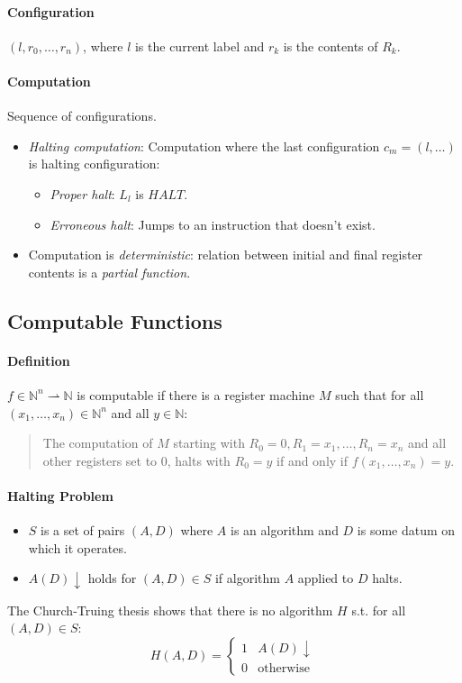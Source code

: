 \documentclass[twocolumn,english]{article}
\begin{document}
\paragraph{Configuration}

$\left(l,r_{0},\dots,r_{n}\right)$, where $l$ is the current label
and $r_{k}$ is the contents of $R_{k}$.

\paragraph{Computation}

Sequence of configurations.
\begin{itemize}
\item \emph{Halting computation}: Computation where the last configuration
$c_{m}=\left(l,\dots\right)$ is halting configuration:
\begin{itemize}
\item \emph{Proper halt}: $L_{l}$ is $HALT$.
\item \emph{Erroneous halt}: Jumps to an instruction that doesn't exist.
\end{itemize}
\item Computation is \emph{deterministic}: relation between initial and
final register contents is a \emph{partial function}.
\end{itemize}

\subsection{Computable Functions}

\paragraph{Definition}

$f\in\mathbb{N}^{n}\rightharpoonup\mathbb{N}$ is computable if there
is a register machine $M$ such that for all $\left(x_{1},\dots,x_{n}\right)\in\mathbb{N}^{n}$
and all $y\in\mathbb{N}$:
\begin{quotation}
The computation of $M$ starting with $R_{0}=0,R_{1}=x_{1},\dots,R_{n}=x_{n}$
and all other registers set to 0, halts with $R_{0}=y$ if and only
if $f\left(x_{1},\dots,x_{n}\right)=y$.
\end{quotation}

\paragraph{Halting Problem}
\begin{itemize}
\item $S$ is a set of pairs $\left(A,D\right)$ where $A$ is an algorithm
and $D$ is some datum on which it operates.
\item $A\left(D\right)\downarrow$ holds for $\left(A,D\right)\in S$ if
algorithm $A$ applied to $D$ halts.
\end{itemize}
The Church-Truing thesis shows that there is no algorithm $H$ s.t.
for all $\left(A,D\right)\in S$:
\[
H\left(A,D\right)=\begin{cases}
1 & A\left(D\right)\downarrow\\
0 & \text{otherwise}
\end{cases}
\]
\end{document}
